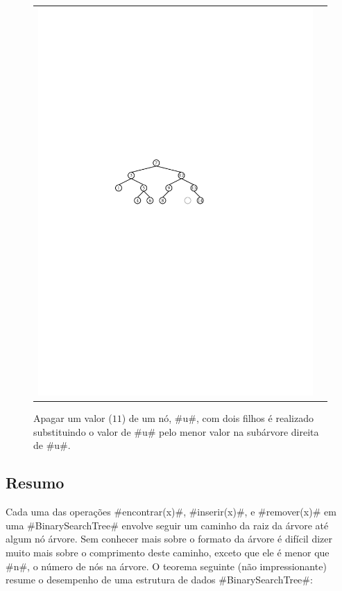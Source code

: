 \begin{figure}
\begin{center}
\begin{tabular}{cc}
    \includegraphics[width=\HalfScaleIfNeeded]{figs/bst-delete-2}
    \end{tabular}
  \end{center}
  \caption[Apagar de uma BinarySearchTree]{Apagar um valor ($11$) de um nó, #u#, com dois filhos é realizado substituindo o valor de #u# pelo menor valor na subárvore direita de #u#.}
\end{figure}

\subsection{Resumo}

Cada uma das operações #encontrar(x)#, #inserir(x)#, e #remover(x)# em uma
#BinarySearchTree# envolve seguir um caminho da raiz da árvore até algum nó árvore. Sem conhecer mais sobre o formato da árvore é difícil dizer muito mais sobre o comprimento deste caminho, exceto que ele é menor que #n#, o número de nós na árvore.
O teorema seguinte (não impressionante) resume o desempenho de uma estrutura de dados #BinarySearchTree#:

